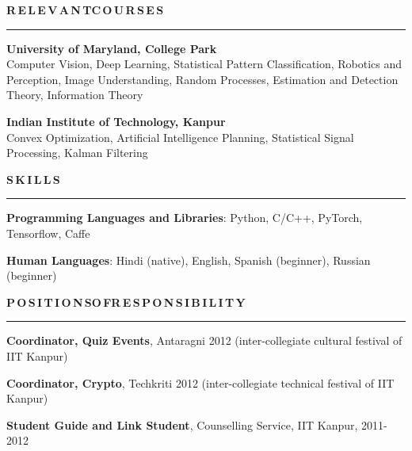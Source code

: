 \documentclass[11pt, a4paper]{article}
\begin{document}
\vspace{10pt}
\textbf{R\,E\,L\,E\,V\,A\,N\,T{\hspace{0.6em}}C\,O\,U\,R\,S\,E\,S}
\vspace{5pt}
\hrule
\vspace{7pt}
\textbf{University of Maryland, College Park}\\
Computer Vision, Deep Learning, Statistical Pattern Classification, Robotics and Perception, Image Understanding, Random Processes, Estimation and Detection Theory, Information Theory

\vspace{5pt}

\textbf{Indian Institute of Technology, Kanpur}\\
Convex Optimization, Artificial Intelligence Planning, Statistical Signal Processing, Kalman
Filtering%

\vspace{10pt}

\textbf{S\,K\,I\,L\,L\,S}
\vspace{5pt}
\hrule
\vspace{7pt}
\textbf{Programming Languages and Libraries}: Python, C/C++, PyTorch, Tensorflow, Caffe

\textbf{Human Languages}: Hindi (native), English, Spanish (beginner), Russian (beginner)

\vspace{10pt}

\textbf{P\,O\,S\,I\,T\,I\,O\,N\,S{\hspace{0.6em}}O\,F{\hspace{0.6em}}R\,E\,S\,P\,O\,N\,S\,I\,B\,I\,L\,I\,T\,Y}
\vspace{5pt}
\hrule
\vspace{7pt}
\textbf{Coordinator, Quiz Events}, Antaragni 2012 (inter-collegiate cultural festival of IIT Kanpur)

\vspace{2pt}

\textbf{Coordinator, Crypto}, Techkriti 2012 (inter-collegiate technical festival of IIT Kanpur)

\vspace{2pt}

\textbf{Student Guide and Link Student}, Counselling Service, IIT Kanpur, 2011-2012
\end{document}
